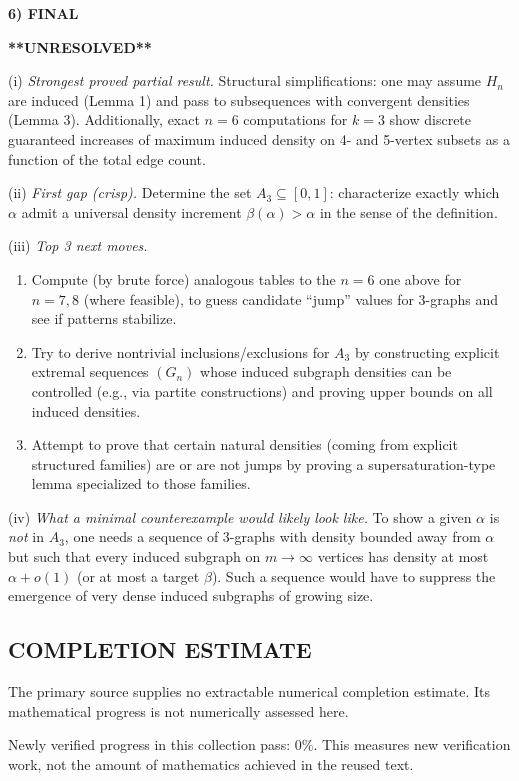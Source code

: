 \medskip
\noindent\textbf{6) FINAL}

\textbf{**UNRESOLVED**}

(i) \emph{Strongest proved partial result.} Structural simplifications: one may assume $H_n$ are induced (Lemma 1) and pass to subsequences with convergent densities (Lemma 3). Additionally, exact $n=6$ computations for $k=3$ show discrete guaranteed increases of maximum induced density on 4- and 5-vertex subsets as a function of the total edge count.

(ii) \emph{First gap (crisp).} Determine the set $A_3\subseteq[0,1]$: characterize exactly which $\alpha$ admit a universal density increment $\beta(\alpha)>\alpha$ in the sense of the definition.

(iii) \emph{Top 3 next moves.}
\begin{enumerate}
\item Compute (by brute force) analogous tables to the $n=6$ one above for $n=7,8$ (where feasible), to guess candidate ``jump'' values for 3-graphs and see if patterns stabilize.
\item Try to derive nontrivial inclusions/exclusions for $A_3$ by constructing explicit extremal sequences $(G_n)$ whose induced subgraph densities can be controlled (e.g., via partite constructions) and proving upper bounds on all induced densities.
\item Attempt to prove that certain natural densities (coming from explicit structured families) are or are not jumps by proving a supersaturation-type lemma specialized to those families.
\end{enumerate}

(iv) \emph{What a minimal counterexample would likely look like.} To show a given $\alpha$ is \emph{not} in $A_3$, one needs a sequence of 3-graphs with density bounded away from $\alpha$ but such that every induced subgraph on $m\to\infty$ vertices has density at most $\alpha+o(1)$ (or at most a target $\beta$). Such a sequence would have to suppress the emergence of very dense induced subgraphs of growing size.




\subsection*{COMPLETION ESTIMATE}
The primary source supplies no extractable numerical completion estimate. Its mathematical progress is not numerically assessed here.

Newly verified progress in this collection pass: $0\%$. This measures new verification work, not the amount of mathematics achieved in the reused text.
